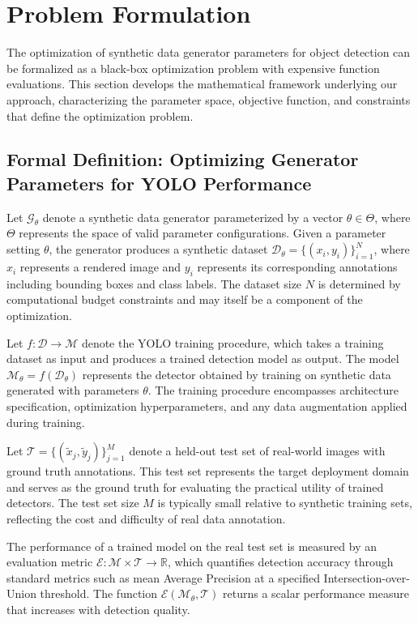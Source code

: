 \section{Problem Formulation}
\label{sec:problem_formulation}

The optimization of synthetic data generator parameters for object detection can be formalized as a black-box optimization problem with expensive function evaluations. This section develops the mathematical framework underlying our approach, characterizing the parameter space, objective function, and constraints that define the optimization problem.

\subsection{Formal Definition: Optimizing Generator Parameters for YOLO Performance}
\label{subsec:formal_definition}

Let $\mathcal{G}_\theta$ denote a synthetic data generator parameterized by a vector $\theta \in \Theta$, where $\Theta$ represents the space of valid parameter configurations. Given a parameter setting $\theta$, the generator produces a synthetic dataset $\mathcal{D}_\theta = \{(x_i, y_i)\}_{i=1}^N$, where $x_i$ represents a rendered image and $y_i$ represents its corresponding annotations including bounding boxes and class labels. The dataset size $N$ is determined by computational budget constraints and may itself be a component of the optimization.

Let $f: \mathcal{D} \rightarrow \mathcal{M}$ denote the YOLO training procedure, which takes a training dataset as input and produces a trained detection model as output. The model $\mathcal{M}_\theta = f(\mathcal{D}_\theta)$ represents the detector obtained by training on synthetic data generated with parameters $\theta$. The training procedure encompasses architecture specification, optimization hyperparameters, and any data augmentation applied during training.

Let $\mathcal{T} = \{(\tilde{x}_j, \tilde{y}_j)\}_{j=1}^M$ denote a held-out test set of real-world images with ground truth annotations. This test set represents the target deployment domain and serves as the ground truth for evaluating the practical utility of trained detectors. The test set size $M$ is typically small relative to synthetic training sets, reflecting the cost and difficulty of real data annotation.

The performance of a trained model on the real test set is measured by an evaluation metric $\mathcal{E}: \mathcal{M} \times \mathcal{T} \rightarrow \mathbb{R}$, which quantifies detection accuracy through standard metrics such as mean Average Precision at a specified Intersection-over-Union threshold. The function $\mathcal{E}(\mathcal{M}_\theta, \mathcal{T})$ returns a scalar performance measure that increases with detection quality.

